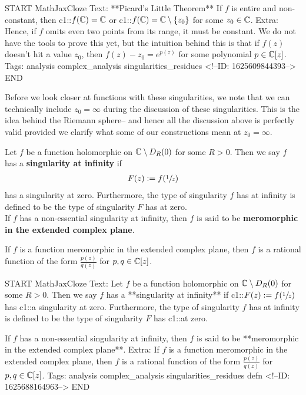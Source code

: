 \documentclass{memoir}
\begin{document}
\begin{anki}
START
MathJaxCloze
Text: **Picard's Little Theorem**
If \(f\) is entire and non-constant, then {{c1::\(f(\mathbb{C}) = \mathbb{C}\)}} or {{c1::\(f(\mathbb{C}) = \mathbb{C}\setminus\left\{ z_0 \right\} \)}} for some \(z_0 \in \mathbb{C}\).
Extra: Hence, if \(f\) omits even two points from its range, it must be constant. We do not have the tools to prove this yet, but the intuition behind this is that if \(f(z)\) doesn't hit a value \(z_0\), then \(f(z)-z_0 = e^{p(z)}\) for some polynomial \(p \in \mathbb{C}[z]\).
Tags: analysis complex_analysis singularities_residues
<!--ID: 1625609844393-->
END
\end{anki}

Before we look closer at functions with these singularities, we note that we can technically include \(z_0=\infty\) during the discussion of these singularities. This is the idea behind the Riemann sphere-- and hence all the discussion above is perfectly valid provided we clarify what some of our constructions mean at \(z_0 = \infty\).

\begin{defn}
	Let \(f\) be a function holomorphic on \(\mathbb{C}\setminus D_R(0)\) for some \(R>0\). Then we say \(f\) has a \textbf{singularity at infinity} if
	\begin{align*}
		F(z) := f(\sfrac{1}{z})
	\end{align*}
	has a singularity at zero. Furthermore, the type of singularity \(f\) has at infinity is defined to be the type of singularity \(F\) has at zero.\\

	If \(f\) has a non-essential singularity at infinity, then \(f\) is said to be \textbf{meromorphic in the extended complex plane}.
\end{defn}

\begin{prop}
	If \(f\) is a function meromorphic in the extended complex plane, then \(f\) is a rational function of the form \(\frac{p(z)}{q(z)}\) for \(p,q \in \mathbb{C}[z]\).
\end{prop}

\begin{anki}
START
MathJaxCloze
Text: Let \(f\) be a function holomorphic on \(\mathbb{C}\setminus D_R(0)\) for some \(R>0\). Then we say \(f\) has a **singularity at infinity** if
 {{c1::\(\begin{align*}
         	F(z) := f(\sfrac{1}{z})
         \end{align*}\)}}
has {{c1::a singularity at zero}}. Furthermore, the type of singularity \(f\) has at infinity is defined to be the type of singularity \(F\) has {{c1::at zero}}.

If \(f\) has a non-essential singularity at infinity, then \(f\) is said to be **meromorphic in the extended complex plane**.
Extra: If \(f\) is a function meromorphic in the extended complex plane, then \(f\) is a rational function of the form \(\frac{p(z)}{q(z)}\) for \(p,q \in \mathbb{C}[z]\).
Tags: analysis complex_analysis singularities_residues defn
<!--ID: 1625688164963-->
END
\end{anki}


\end{document}
